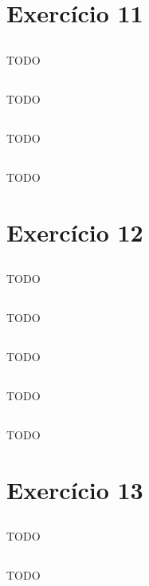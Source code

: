 \documentclass{article}
\begin{document}
\section{Exercício 11}
\subsection{}
TODO
\subsection{}
TODO
\subsection{}
TODO
\subsection{}
TODO

\section{Exercício 12}
\subsection{}
TODO
\subsection{}
TODO
\subsection{}
TODO
\subsection{}
TODO
\subsection{}
TODO

\section{Exercício 13}
\subsection{}
TODO
\subsection{}
TODO
\end{document}
